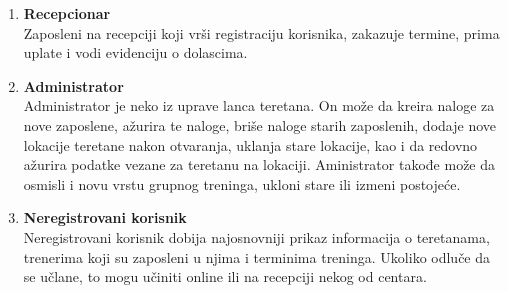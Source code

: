 \documentclass[../main.tex]{subfiles}
\begin{document}
\begin{enumerate}
  \item  \textbf{Recepcionar} \\ Zaposleni na recepciji koji vrši registraciju korisnika, zakazuje termine, prima uplate i vodi evidenciju o dolascima.
  \item \textbf{Administrator}\\
  Administrator je neko iz uprave lanca teretana. On može da kreira naloge za nove zaposlene, ažurira te naloge, briše naloge starih zaposlenih, dodaje nove lokacije teretane nakon otvaranja, uklanja stare lokacije, kao i da redovno ažurira podatke vezane za teretanu na lokaciji. Aministrator takođe može da osmisli i novu vrstu grupnog treninga, ukloni stare ili izmeni postojeće.
  \item \textbf{Neregistrovani korisnik} \\
  Neregistrovani korisnik dobija najosnovniji prikaz informacija o teretanama, trenerima koji su zaposleni u njima i terminima treninga. Ukoliko odluče da se učlane, to mogu učiniti online ili na recepciji nekog od centara.  
\end{enumerate}
\end{document}
